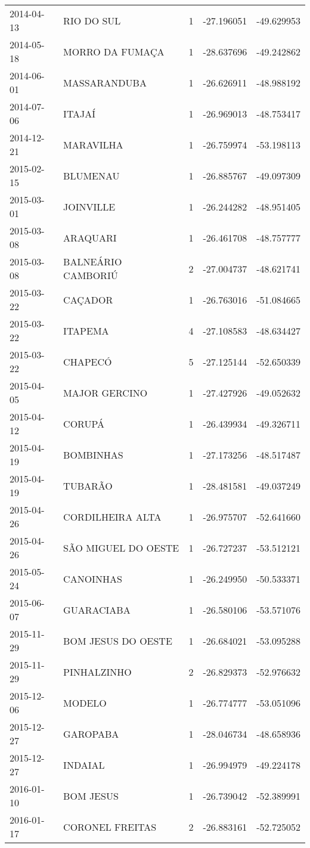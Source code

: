 \documentclass[
	12pt,				%
	openright,			%
	oneside,			%
	a4paper,			%
	english,			%
	french,				%
	spanish,			%
	brazil				%
	dvipsnames, table]{abntex2}
\begin{document}
\begin{longtable}[htbp]{llcrr}
2014-04-13 & RIO DO SUL & 1 & -27.196051 & -49.629953 \\
2014-05-18 & MORRO DA FUMAÇA & 1 & -28.637696 & -49.242862 \\
2014-06-01 & MASSARANDUBA & 1 & -26.626911 & -48.988192 \\
2014-07-06 & ITAJAÍ & 1 & -26.969013 & -48.753417 \\
2014-12-21 & MARAVILHA & 1 & -26.759974 & -53.198113 \\
2015-02-15 & BLUMENAU & 1 & -26.885767 & -49.097309 \\
2015-03-01 & JOINVILLE & 1 & -26.244282 & -48.951405 \\
2015-03-08 & ARAQUARI & 1 & -26.461708 & -48.757777 \\
2015-03-08 & BALNEÁRIO CAMBORIÚ & 2 & -27.004737 & -48.621741 \\
2015-03-22 & CAÇADOR & 1 & -26.763016 & -51.084665 \\
2015-03-22 & ITAPEMA & 4 & -27.108583 & -48.634427 \\
2015-03-22 & CHAPECÓ & 5 & -27.125144 & -52.650339 \\
2015-04-05 & MAJOR GERCINO & 1 & -27.427926 & -49.052632 \\
2015-04-12 & CORUPÁ & 1 & -26.439934 & -49.326711 \\
2015-04-19 & BOMBINHAS & 1 & -27.173256 & -48.517487 \\
2015-04-19 & TUBARÃO & 1 & -28.481581 & -49.037249 \\
2015-04-26 & CORDILHEIRA ALTA & 1 & -26.975707 & -52.641660 \\
2015-04-26 & SÃO MIGUEL DO OESTE & 1 & -26.727237 & -53.512121 \\
2015-05-24 & CANOINHAS & 1 & -26.249950 & -50.533371 \\
2015-06-07 & GUARACIABA & 1 & -26.580106 & -53.571076 \\
2015-11-29 & BOM JESUS DO OESTE & 1 & -26.684021 & -53.095288 \\
2015-11-29 & PINHALZINHO & 2 & -26.829373 & -52.976632 \\
2015-12-06 & MODELO & 1 & -26.774777 & -53.051096 \\
2015-12-27 & GAROPABA & 1 & -28.046734 & -48.658936 \\
2015-12-27 & INDAIAL & 1 & -26.994979 & -49.224178 \\
2016-01-10 & BOM JESUS & 1 & -26.739042 & -52.389991 \\
2016-01-17 & CORONEL FREITAS & 2 & -26.883161 & -52.725052 \\

\end{longtable}
\end{document}

